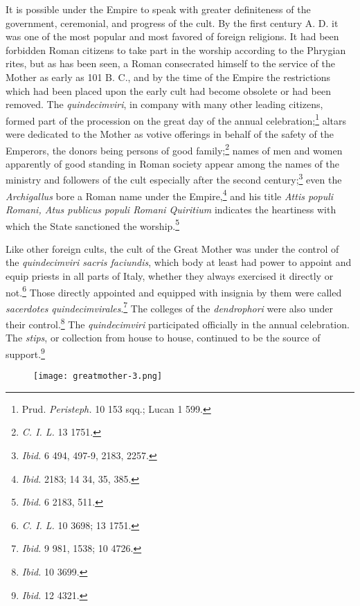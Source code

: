 \documentclass[a4paper, 11pt, oneside, polutonikogreek, english]{article}
\begin{document}
It is possible under the Empire to speak with greater definiteness of the government, ceremonial, and progress of the cult. By the first century A. D. it was one of the most popular and most favored of foreign religions. It had been forbidden Roman citizens to take part in the worship according to the Phrygian rites, but as has been seen, a Roman consecrated himself to the service of the Mother as early as 101 B. C., and by the time of the Empire the restrictions which had been placed upon the early cult had become obsolete or had been removed. The \emph{quindecimviri}, in company with many other leading citizens, formed part of the procession on the great day of the annual celebration;\footnote{Prud. \emph{Peristeph.} 10 153 sqq.; Lucan 1 599.} altars were dedicated to the Mother as votive offerings in behalf of the safety of the Emperors, the donors being persons of good family;\footnote{\emph{C. I. L.} 13 1751.} names of men and women apparently of good standing in Roman society appear among the names of the ministry and followers of the cult especially after the second century;\footnote{\emph{Ibid.} 6 494, 497-9, 2183, 2257.} even the \emph{Archigallus} bore a Roman name under the Empire,\footnote{\emph{Ibid.} 2183; 14 34, 35, 385.} and his title \emph{Attis populi Romani, Atus publicus populi Romani Quiritium} indicates the heartiness with which the State sanctioned the worship.\footnote{\emph{Ibid.} 6 2183, 511.}

Like other foreign cults, the cult of the Great Mother was under the control of the \emph{quindecimviri sacris faciundis}, which body at least had power to appoint and equip priests in all parts of Italy, whether they always exercised it directly or not.\footnote{\emph{C. I. L.} 10 3698; 13 1751.} Those directly appointed and equipped with insignia by them were called \emph{sacerdotes quindecimvirales}.\footnote{\emph{Ibid.} 9 981, 1538; 10 4726.} The colleges of the \emph{dendrophori} were also under their control.\footnote{\emph{Ibid.} 10 3699.} The \emph{quindecimviri} participated officially in the annual celebration. The \emph{stips}, or collection from house to house, continued to be the source of support.\footnote{\emph{Ibid.} 12 4321.}

\begin{figure}[H]
\centering
\texttt{[image: greatmother-3.png]}
\caption{}
\end{figure}
\end{document}
